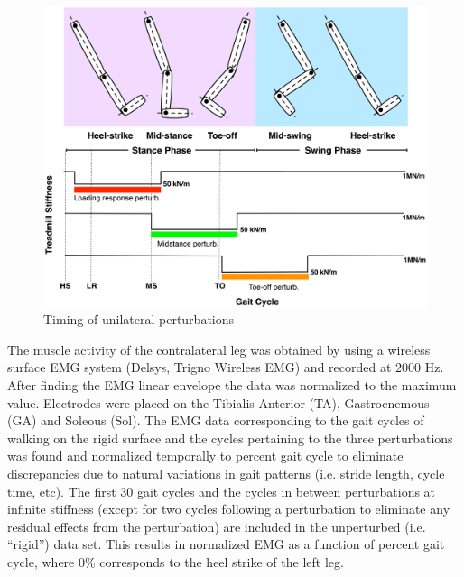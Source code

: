 \begin{figure}
\centering
\includegraphics[width=1\columnwidth]{Figures/show_perturbs}
\caption{Timing of unilateral perturbations }
\label{show_perturbs}
\end{figure}

The muscle activity of the contralateral leg was obtained by using a wireless surface EMG system (Delsys,  Trigno Wireless EMG) and recorded at $2000$ Hz.  After finding the EMG linear envelope the data was normalized to the maximum value.  Electrodes were placed on the Tibialis Anterior (TA), Gastrocnemous (GA) and Soleous (Sol). The EMG data corresponding to the gait cycles of walking on the rigid surface and the cycles pertaining to the three perturbations was found and normalized temporally to percent gait cycle to eliminate discrepancies due to natural variations in gait patterns (i.e. stride length, cycle time, etc).  The first 30 gait cycles and the cycles in between perturbations at infinite stiffness (except for two cycles following a perturbation to eliminate any residual effects from the perturbation) are included in the unperturbed (i.e. ``rigid'') data set.  This results in normalized EMG as a function of percent gait cycle, where 0\% corresponds to the heel strike of the left leg.






